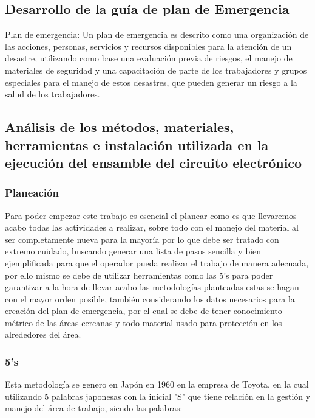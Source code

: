         \subsection{Desarrollo de la guía de plan de Emergencia}

        Plan de emergencia: Un plan de emergencia es descrito como una organización de las acciones, personas, servicios y recursos disponibles para la atención de un desastre, utilizando como base una evaluación previa de riesgos, el manejo de materiales de seguridad y una capacitación de parte de los trabajadores y grupos especiales para el manejo de estos desastres, que pueden generar un riesgo a la salud de los trabajadores.\cite{PlanEmer}

        \subsection{Análisis de los métodos, materiales, herramientas e instalación utilizada en la ejecución del ensamble del circuito electrónico}

        \subsubsection{Planeación}

        Para poder empezar este trabajo es esencial el planear como es que llevaremos acabo todas las actividades a realizar, sobre todo con el manejo del material al ser completamente nueva para la mayoría por lo que debe ser tratado con extremo cuidado, buscando generar una lista de pasos sencilla y bien ejemplificada para que el operador pueda realizar el trabajo de manera adecuada, por ello mismo se debe de utilizar herramientas como las 5's para poder garantizar a la hora de llevar acabo las metodologías planteadas estas se hagan con el mayor orden posible, también considerando los datos necesarios para la creación del plan de emergencia, por el cual se debe de tener conocimiento métrico de las áreas cercanas y todo material usado para protección en los alrededores del área.

     \subsubsection{5's}

     Esta metodología se genero en Japón en 1960 en la empresa de Toyota, en la cual utilizando 5 palabras japonesas con la inicial "S" que tiene relación en la gestión y manejo del área de trabajo, siendo las palabras\cite{5S}:

